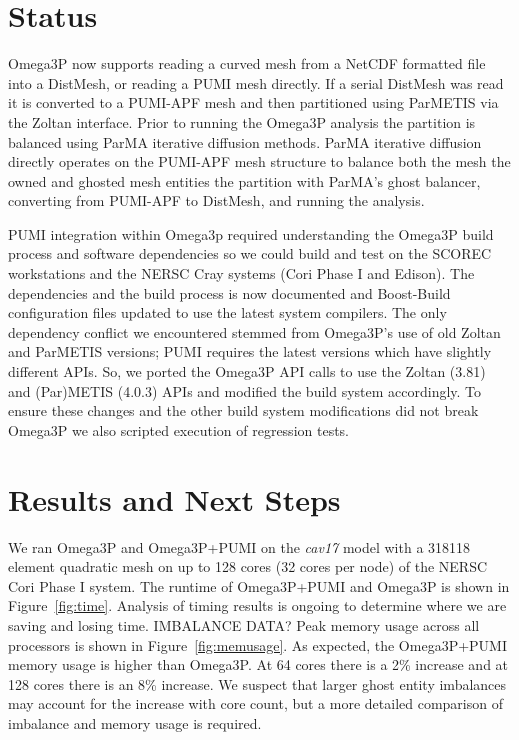 \documentclass[a4paper]{article}
\begin{document}
\section{Status}
Omega3P now supports reading a curved mesh from a NetCDF formatted file into a
DistMesh, or reading a PUMI mesh directly.
If a serial DistMesh was read it is converted to a PUMI-APF mesh and then 
partitioned using ParMETIS via the Zoltan interface.
Prior to running the Omega3P analysis the partition is balanced using ParMA
iterative diffusion methods.
ParMA iterative diffusion directly operates on the PUMI-APF mesh structure to
balance both the mesh 
the owned and ghosted mesh entities 
the partition with ParMA's ghost balancer, converting from PUMI-APF to DistMesh,
and running the analysis.

PUMI integration within Omega3p required understanding the Omega3P build process
and software dependencies so we could build and test on the SCOREC workstations
and the NERSC Cray systems (Cori Phase I and Edison).
The dependencies and the build process is now documented and Boost-Build
configuration files updated to use the latest system compilers.
The only dependency conflict we encountered stemmed from Omega3P's use of old
Zoltan and ParMETIS versions; PUMI requires the latest versions which have
slightly different APIs.
So, we ported the Omega3P API calls to use the Zoltan (3.81) and
(Par)METIS (4.0.3) APIs and modified the build system accordingly.
To ensure these changes and the other build system modifications did not break
Omega3P we also scripted execution of regression tests.

\section{Results and Next Steps}

We ran Omega3P and Omega3P+PUMI on the \textit{cav17} model with a 318118
element quadratic mesh on up to 128 cores (32 cores per node) of the NERSC Cori
Phase I system.
The runtime of Omega3P+PUMI and Omega3P is shown in Figure~\ref{fig:time}.
Analysis of timing results is ongoing to determine where we are saving and
losing time.
IMBALANCE DATA?
Peak memory usage across all processors is shown in
Figure~\ref{fig:memusage}.
As expected, the Omega3P+PUMI memory usage is higher than Omega3P.
At 64 cores there is a 2\% increase and at 128 cores there is an 8\% increase.
We suspect that larger ghost entity imbalances may account for the increase with
core count, but a more detailed comparison of imbalance and memory usage is
required.
\end{document}
